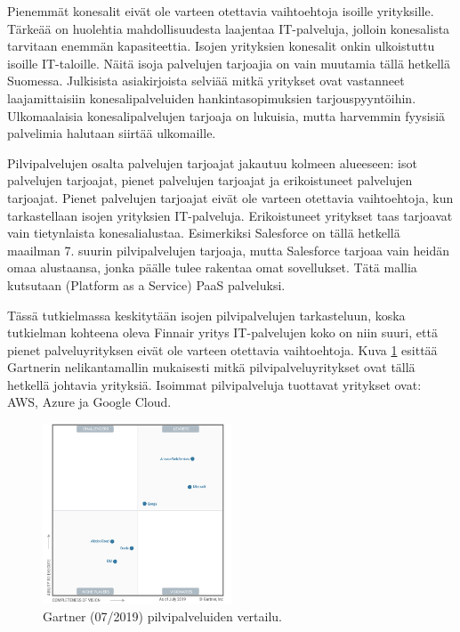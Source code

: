 Pienemmät konesalit eivät ole varteen otettavia vaihtoehtoja isoille yrityksille. Tärkeää on huolehtia mahdollisuudesta laajentaa IT-palveluja, jolloin konesalista tarvitaan enemmän kapasiteettia. Isojen yrityksien konesalit onkin ulkoistuttu isoille IT-taloille. Näitä isoja palvelujen tarjoajia on vain muutamia tällä hetkellä Suomessa. Julkisista asiakirjoista selviää mitkä yritykset ovat vastanneet laajamittaisiin konesalipalveluiden hankintasopimuksien tarjouspyyntöihin.\citep{nurmijarvi} Ulkomaalaisia konesalipalvelujen tarjoaja on lukuisia, mutta harvemmin fyysisiä palvelimia halutaan siirtää ulkomaille.

Pilvipalvelujen osalta palvelujen tarjoajat jakautuu kolmeen alueeseen: isot palvelujen tarjoajat, pienet palvelujen tarjoajat ja erikoistuneet palvelujen tarjoajat. Pienet palvelujen tarjoajat eivät ole varteen otettavia vaihtoehtoja, kun tarkastellaan isojen yrityksien IT-palveluja. Erikoistuneet yritykset taas tarjoavat vain tietynlaista konesalialustaa. Esimerkiksi Salesforce on tällä hetkellä maailman 7. suurin pilvipalvelujen tarjoaja, mutta Salesforce tarjoaa vain heidän omaa alustaansa, jonka päälle tulee rakentaa omat sovellukset. Tätä mallia kutsutaan (Platform as a Service) PaaS palveluksi.\citep{top_cloud}

Tässä tutkielmassa keskitytään isojen pilvipalvelujen tarkasteluun, koska tutkielman kohteena oleva Finnair yritys IT-palvelujen koko on niin suuri, että pienet palveluyrityksen eivät ole varteen otettavia vaihtoehtoja. Kuva \ref{gartner} esittää Gartnerin nelikantamallin mukaisesti mitkä pilvipalveluyritykset ovat tällä hetkellä johtavia yrityksiä. Isoimmat pilvipalveluja tuottavat yritykset ovat: AWS, Azure ja Google Cloud.

\begin{figure}[ht]
\centering 
\includegraphics[width=0.50\textwidth]{figures/CloudIaaS.png}
\caption{Gartner (07/2019) pilvipalveluiden vertailu. \citep{top_cloud}}\label{gartner}
\end{figure}


